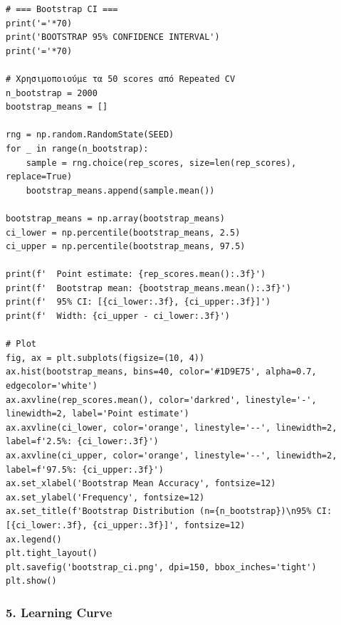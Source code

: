 \begin{lstlisting}
# === Bootstrap CI ===
print('='*70)
print('BOOTSTRAP 95% CONFIDENCE INTERVAL')
print('='*70)
 
# Χρησιμοποιούμε τα 50 scores από Repeated CV
n_bootstrap = 2000
bootstrap_means = []
 
rng = np.random.RandomState(SEED)
for _ in range(n_bootstrap):
    sample = rng.choice(rep_scores, size=len(rep_scores), replace=True)
    bootstrap_means.append(sample.mean())
 
bootstrap_means = np.array(bootstrap_means)
ci_lower = np.percentile(bootstrap_means, 2.5)
ci_upper = np.percentile(bootstrap_means, 97.5)
 
print(f'  Point estimate: {rep_scores.mean():.3f}')
print(f'  Bootstrap mean: {bootstrap_means.mean():.3f}')
print(f'  95% CI: [{ci_lower:.3f}, {ci_upper:.3f}]')
print(f'  Width: {ci_upper - ci_lower:.3f}')
 
# Plot
fig, ax = plt.subplots(figsize=(10, 4))
ax.hist(bootstrap_means, bins=40, color='#1D9E75', alpha=0.7, edgecolor='white')
ax.axvline(rep_scores.mean(), color='darkred', linestyle='-', linewidth=2, label='Point estimate')
ax.axvline(ci_lower, color='orange', linestyle='--', linewidth=2, label=f'2.5%: {ci_lower:.3f}')
ax.axvline(ci_upper, color='orange', linestyle='--', linewidth=2, label=f'97.5%: {ci_upper:.3f}')
ax.set_xlabel('Bootstrap Mean Accuracy', fontsize=12)
ax.set_ylabel('Frequency', fontsize=12)
ax.set_title(f'Bootstrap Distribution (n={n_bootstrap})\n95% CI: [{ci_lower:.3f}, {ci_upper:.3f}]', fontsize=12)
ax.legend()
plt.tight_layout()
plt.savefig('bootstrap_ci.png', dpi=150, bbox_inches='tight')
plt.show()
\end{lstlisting}
 
\subsubsection*{5. Learning Curve}
 
